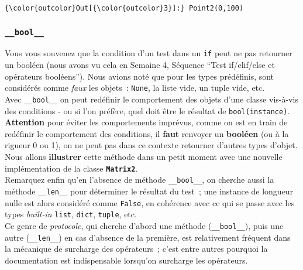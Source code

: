 \begin{Verbatim}[commandchars=\\\{\}]
{\color{outcolor}Out[{\color{outcolor}3}]:} Point2(0,100)
\end{Verbatim}
            

    \hypertarget{bool__}{%
\subsubsection{\texorpdfstring{\texttt{\_\_bool\_\_}}{\_\_bool\_\_}}\label{bool__}}

    Vous vous souvenez que la condition d'un test dans un \texttt{if} peut
ne pas retourner un booléen (nous avons vu cela en Semaine 4, Séquence
``Test if/elif/else et opérateurs booléens''). Nous avions noté que pour
les types prédéfinis, sont considérés comme \emph{faux} les objets~:
\texttt{None}, la liste vide, un tuple vide, etc.\\

Avec \texttt{\_\_bool\_\_} on peut redéfinir le comportement des objets
d'une classe vis-à-vis des conditions - ou si l'on préfère, quel doit
être le résultat de \texttt{bool(instance)}.\\

\textbf{Attention} pour éviter les comportements imprévus, comme on est
en train de redéfinir le comportement des conditions, il \textbf{faut}
renvoyer un \textbf{booléen} (ou à la rigueur 0 ou 1), on ne peut pas
dans ce contexte retourner d'autres types d'objet.\\

Nous allons \textbf{illustrer} cette méthode dans un petit moment avec
une nouvelle implémentation de la classe \textbf{\texttt{Matrix2}}.\\

Remarquez enfin qu'en l'absence de méthode \texttt{\_\_bool\_\_}, on
cherche aussi la méthode \texttt{\_\_len\_\_} pour déterminer le
résultat du test~; une instance de longueur nulle est alors considéré
comme \texttt{False}, en cohérence avec ce qui se passe avec les types
\emph{built-in} \texttt{list}, \texttt{dict}, \texttt{tuple}, etc.\\

Ce genre de \emph{protocole}, qui cherche d'abord une méthode
(\texttt{\_\_bool\_\_}), puis une autre (\texttt{\_\_len\_\_}) en cas
d'absence de la première, est relativement fréquent dans la mécanique de
surcharge des opérateurs~; c'est entre autres pourquoi la documentation
est indispensable lorsqu'on surcharge les opérateurs.

